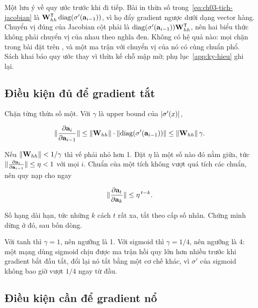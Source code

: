 Một lưu ý về quy ước trước khi đi tiếp. Bài in thừa số trong~\eqref{eq:ch03-tich-jacobian}
là \(\mathbf{W}_{hh}^{\mathsf{T}} \operatorname{diag}(\sigma'(\mathbf{a}_{i-1}))\), vì họ đẩy gradient
ngược dưới dạng vector hàng. Chuyển vị đúng của Jacobian cột phải là
\(\operatorname{diag}(\sigma'(\mathbf{a}_{i-1})) \mathbf{W}_{hh}^{\mathsf{T}}\), nên hai biểu thức
không phải chuyển vị của nhau theo nghĩa đen. Không có hệ quả nào: mọi chặn
trong bài đặt trên , và một ma trận với chuyển vị của nó có cùng chuẩn
phổ. Sách khai báo quy ước thay vì thừa kế chỗ mập mờ; phụ
lục~\ref{app:ky-hieu} ghi lại.

\subsection*{Điều kiện đủ để gradient tắt}

%
Chặn từng thừa số một. Với \(\gamma\) là upper bound của \(\lvert \sigma'(x) \rvert\),

\begin{equation}
  \lVert \frac{\partial \mathbf{a}_i}{\partial \mathbf{a}_{i-1}} \rVert
    \le \lVert \mathbf{W}_{hh} \rVert \cdot \lVert \operatorname{diag}(\sigma'(\mathbf{a}_{i-1})) \rVert
    \le \lVert \mathbf{W}_{hh} \rVert \, \gamma.
  \label{eq:ch03-chan-tung-thua-so}
\end{equation}

Nếu \(\lVert \mathbf{W}_{hh} \rVert < 1/\gamma\) thì vế phải nhỏ hơn 1. Đặt \(\eta\) là
một số nào đó nằm giữa, tức \(\lVert \frac{\partial \mathbf{a}_i}{\partial \mathbf{a}_{i-1}} \rVert \le \eta < 1\)
với mọi \(i\). Chuẩn của một tích không vượt quá tích các chuẩn, nên quy nạp
cho ngay

\begin{equation}
  \lVert \frac{\partial \mathbf{a}_t}{\partial \mathbf{a}_k} \rVert \le \eta^{\,t-k}.
  \label{eq:ch03-chan-mu}
\end{equation}

Số hạng dài hạn, tức những \(k\) cách \(t\) rất xa, tắt theo cấp số nhân. Chứng
minh dừng ở đó, sau bốn dòng.

Với tanh thì \(\gamma = 1\), nên ngưỡng là 1. Với sigmoid thì \(\gamma = 1/4\),
nên ngưỡng là 4: một mạng dùng sigmoid chịu được ma trận hồi quy lớn hơn nhiều
trước khi gradient bắt đầu tắt, đổi lại nó tắt bằng một cơ chế khác, vì
\(\sigma'\) của sigmoid không bao giờ vượt \(1/4\) ngay từ đầu.

\subsection*{Điều kiện cần để gradient nổ}

